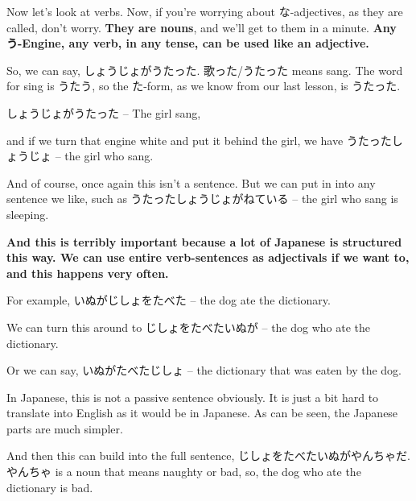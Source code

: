 \stopsectionlevel

\startsectionlevel[title={Using verbs like adjectives},reference={using-verbs-like-adjectives}]

Now let's look at verbs. Now, if you're worrying about な-adjectives, as they are called, don't worry. {\bf They are nouns}, and we'll get to them in a minute. {\bf Any う-Engine, any verb, in any tense, can be used like an adjective.}

{}

So, we can say, しょうじょがうたった. 歌った/うたった means sang. The word for sing is うたう, so the た-form, as we know from our last lesson, is うたった.

しょうじょがうたった -- The girl sang,

{}

and if we turn that engine white and put it behind the girl, we have うたったしょうじょ -- the girl who sang.

{}

And of course, once again this isn't a sentence. But we can put in into any sentence we like, such as うたったしょうじょがねている -- the girl who sang is sleeping.

{}

{\bf And this is terribly important because a lot of Japanese is structured this way. We can use entire verb-sentences as adjectivals if we want to, and this happens very often.}

For example, いぬがじしょをたべた -- the dog ate the dictionary.

{}

We can turn this around to じしょをたべたいぬが -- the dog who ate the dictionary.

{}

Or we can say, いぬがたべたじしょ -- the dictionary that was eaten by the dog.

{}

In Japanese, this is not a passive sentence obviously. It is just a bit hard to translate into English as it would be in Japanese. As can be seen, the Japanese parts are much simpler.

And then this can build into the full sentence, じしょをたべたいぬがやんちゃだ. やんちゃ is a noun that means naughty or bad, so, the dog who ate the dictionary is bad.

